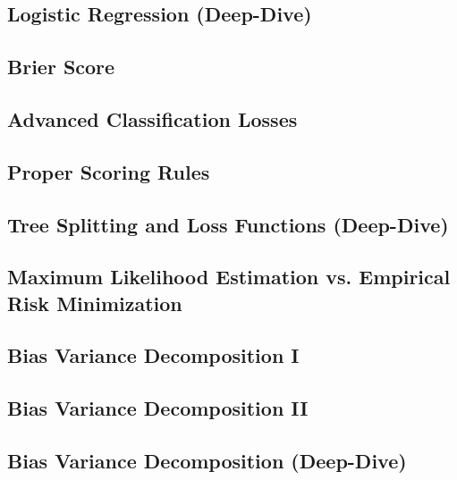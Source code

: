 \subsection{Logistic Regression (Deep-Dive)}


\subsection{Brier Score}


\subsection{Advanced Classification Losses}


\subsection{Proper Scoring Rules}


\subsection{Tree Splitting and Loss Functions (Deep-Dive)}


\subsection{Maximum Likelihood Estimation vs. Empirical Risk Minimization}


\subsection{Bias Variance Decomposition I}


\subsection{Bias Variance Decomposition II}


\subsection{Bias Variance Decomposition (Deep-Dive)}



